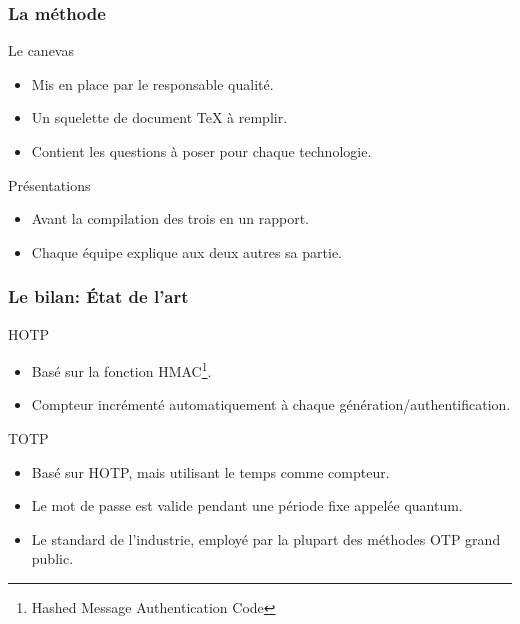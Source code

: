 \documentclass[xcolor=table]{beamer}
\begin{document}
\begin{frame}
\frametitle{La méthode}
\begin{block}{Le canevas}
\begin{itemize}
\item Mis en place par le responsable qualité.
\item Un squelette de document TeX à remplir.
\item Contient les questions à poser pour chaque technologie.
\end{itemize}
\end{block}
\begin{block}{Présentations}
\begin{itemize}
\item Avant la compilation des trois en un rapport.
\item Chaque équipe explique aux deux autres sa partie.
\end{itemize}
\end{block}
\end{frame}

\begin{frame}
\frametitle{Le bilan: État de l'art}
\begin{block}{HOTP}
\begin{itemize}
\item Basé sur la fonction HMAC\footnote{Hashed Message Authentication Code}.
\item Compteur incrémenté automatiquement à chaque génération/authentification.
\end{itemize}
\end{block}

\begin{block}{TOTP}
\begin{itemize}
\item Basé sur HOTP, mais utilisant le temps comme compteur.
\item Le mot de passe est valide pendant une période fixe appelée quantum.
\item Le standard de l'industrie, employé par la plupart des méthodes OTP grand public.
\end{itemize}

\end{block}
\end{frame}
\end{document}
